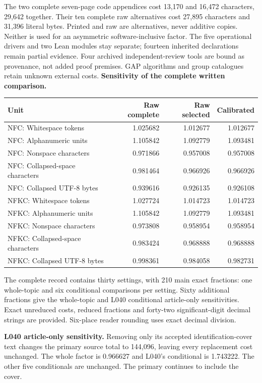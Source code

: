 \documentclass[11pt,a4paper]{article}
\begin{document}
The two complete seven-page code appendices cost 13,170 and 16,472 characters, 29,642 together. Their ten complete raw alternatives cost 27,895 characters and 31,396 literal bytes. Printed and raw are alternatives, never additive copies. Neither is used for an asymmetric software-inclusive factor. The five operational drivers and two Lean modules stay separate; fourteen inherited declarations remain partial evidence. Four archived independent-review tools are bound as provenance, not added proof premises. GAP algorithms and group catalogues retain unknown external costs.
\newpage
\textbf{Sensitivity of the complete written comparison.}
\begin{center}\small\begin{tabular}{lrrr}\toprule
Unit & Raw complete & Raw selected & Calibrated\\\midrule
NFC: Whitespace tokens & 1.025682 & 1.012677 & 1.012677\\
NFC: Alphanumeric units & 1.105842 & 1.092779 & 1.093481\\
NFC: Nonspace characters & 0.971866 & 0.957008 & 0.957008\\
NFC: Collapsed-space characters & 0.981464 & 0.966926 & 0.966926\\
NFC: Collapsed UTF-8 bytes & 0.939616 & 0.926135 & 0.926108\\
NFKC: Whitespace tokens & 1.027724 & 1.014723 & 1.014723\\
NFKC: Alphanumeric units & 1.105842 & 1.092779 & 1.093481\\
NFKC: Nonspace characters & 0.973808 & 0.958954 & 0.958954\\
NFKC: Collapsed-space characters & 0.983424 & 0.968888 & 0.968888\\
NFKC: Collapsed UTF-8 bytes & 0.998361 & 0.984058 & 0.982731\\
\bottomrule\end{tabular}\end{center}
The complete record contains thirty settings, with 210 main exact fractions: one whole-topic and six conditional comparisons per setting. Sixty additional fractions give the whole-topic and L040 conditional article-only sensitivities. Exact unreduced costs, reduced fractions and forty-two significant-digit decimal strings are provided. Six-place reader rounding uses exact decimal division.

\textbf{L040 article-only sensitivity.} Removing only its accepted identification-cover text changes the primary source total to 144,096, leaving every replacement cost unchanged. The whole factor is 0.966627 and L040's conditional is 1.743222. The other five conditionals are unchanged. The primary continues to include the cover.
\end{document}
